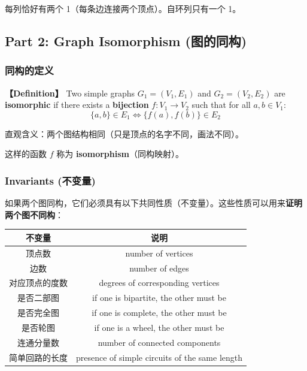 \documentclass[10pt,a4paper,openany]{ctexbook}
\theoremstyle{definition}
\theoremstyle{remark}
\renewenvironment{quote}
  {\list{}{\leftmargin=1em\rightmargin=0pt\topsep=0.5pt\partopsep=0pt}\item[]}
  {\endlist}
\begin{document}
\begin{quote}
每列恰好有两个 1（每条边连接两个顶点）。自环列只有一个 1。

\end{quote}
\vspace{-2pt}

\subsection{Part 2: Graph Isomorphism (图的同构)}

\subsubsection{同构的定义}

\textbf{【Definition】} Two simple graphs $G_1 = (V_1, E_1)$ and $G_2 = (V_2, E_2)$ are \textbf{isomorphic} if there exists a \textbf{bijection} $f: V_1 \to V_2$ such that for all $a, b \in V_1$:
\[
\{a, b\} \in E_1 \iff \{f(a), f(b)\} \in E_2
\]

\begin{quote}
直观含义：两个图结构相同（只是顶点的名字不同，画法不同）。

这样的函数 $f$ 称为 \textbf{isomorphism}（同构映射）。

\end{quote}

\subsubsection{Invariants (不变量)}

如果两个图同构，它们必须具有以下共同性质（不变量）。这些性质可以用来\textbf{证明两个图不同构}：
\begin{center}
\begin{tabular}{cc}
\hline
不变量 & 说明 \\ \hline
顶点数 & number of vertices \\
边数 & number of edges \\
对应顶点的度数 & degrees of corresponding vertices \\
是否二部图 & if one is bipartite, the other must be \\
是否完全图 & if one is complete, the other must be \\
是否轮图 & if one is a wheel, the other must be \\
连通分量数 & number of connected components \\
简单回路的长度 & presence of simple circuits of the same length \\
\hline
\end{tabular}

\end{center}
\end{document}
